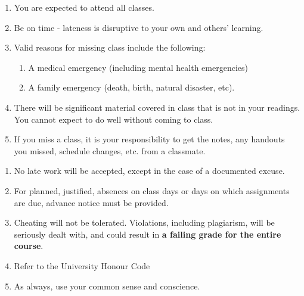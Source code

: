 \documentclass[a4paper,landscape,headrule,footrule,xetex,25pt]{foils}
\begin{document}
\begin{enumerate}\addtolength{\itemsep}{-1ex}
\item You are expected to attend all classes.
\item Be on time - lateness is disruptive to your own and others' learning.
\item Valid reasons for missing class include the following:
\begin{enumerate}
\item A medical emergency (including mental health emergencies)
\item A family emergency (death, birth, natural disaster, etc).
\end{enumerate}
\item There will be significant material covered in class that is not in your readings.  You cannot expect to do well without coming to class.
\item If you miss a class, it is your responsibility to get the notes, any handouts you missed, schedule changes, etc. from a classmate.
\end{enumerate}

\begin{enumerate}
\item No late work will be accepted, except in the case of a documented excuse.
\item For planned, justified, absences on class days or days on which assignments are due, advance notice must be provided.
\item Cheating will not be tolerated. Violations, including plagiarism, will be seriously dealt with, and could result in \textbf{a failing grade for the entire course}.
\item Refer to the University Honour Code
\item As always, use your common sense and conscience.
\end{enumerate}


\end{document}
